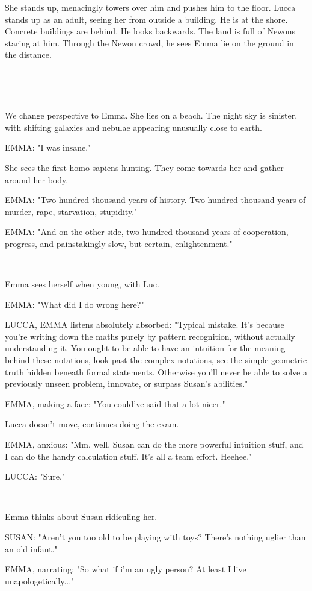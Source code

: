 \documentclass[11pt]{article}
\begin{document}
She stands up, menacingly towers over him and pushes him to the floor.
Lucca stands up as an adult, seeing her from outside a building.
He is at the shore. 
Concrete buildings are behind.
He looks backwards.
The land is full of Newons staring at him.
Through the Newon crowd, he sees Emma lie on the ground in the distance. 

\ 

\ 

We change perspective to Emma. 
She lies on a beach.
The night sky is sinister, with shifting galaxies and nebulae appearing unusually close to earth.

EMMA: "I was insane."

She sees the first homo sapiens hunting.
They come towards her and gather around her body.

EMMA: "Two hundred thousand years of history.
Two hundred thousand years of murder, rape, starvation, stupidity."

EMMA: "And on the other side, two hundred thousand years of cooperation, progress, and painstakingly slow, but certain, enlightenment."

\ 

Emma sees herself when young, with Luc.

EMMA: "What did I do wrong here?"

LUCCA, EMMA listens absolutely absorbed: "Typical mistake.
It's because you're writing down the maths purely by pattern recognition, without actually understanding it.
You ought to be able to have an intuition for the meaning behind these notations, look past the complex notations, see the simple geometric truth hidden beneath formal statements. 
Otherwise you'll never be able to solve a previously unseen problem, innovate, or surpass Susan's abilities."

EMMA, making a face: "You could've said that a lot nicer."

Lucca doesn't move, continues doing the exam.

EMMA, anxious: "Mm, well, Susan can do the more powerful intuition stuff, and I can do the handy calculation stuff. 
It's all a team effort.
Heehee."

LUCCA: "Sure."

\ 

Emma thinks about Susan ridiculing her.

SUSAN: "Aren't you too old to be playing with toys?
There's nothing uglier than an old infant."

EMMA, narrating: "So what if i'm an ugly person?
At least I live unapologetically..."
\end{document}
